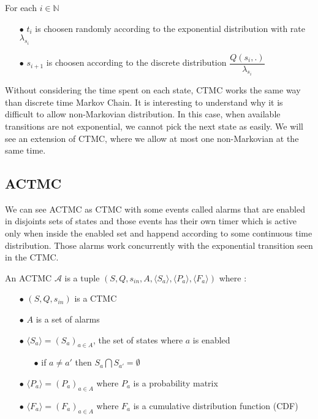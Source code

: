 For each $i \in \mathbb{N}$ \begin{itemize}
	\item[$\bullet$] $t_i$ is choosen randomly according to the exponential distribution with rate $\lambda_{s_i}$
	\item[$\bullet$] $s_{i+1}$ is choosen according to the discrete distribution $\dfrac{Q(s_i,.)}{\lambda_{s_i}}$
\end{itemize}

Without considering the time spent on each state, CTMC works the same way than discrete time Markov Chain. It is interesting to understand why it is difficult to allow non-Markovian distribution. In this case, when available transitions are not exponential, we cannot pick the next state as easily. We will see an extension of CTMC, where we allow at most one non-Markovian at the same time. 

\subsection{ACTMC}

We can see ACTMC as CTMC with some events called alarms that are enabled in disjoints sets of states and those events has their own timer which is active only when inside the enabled set and happend according to some continuous time distribution. Those alarms work concurrently with the exponential transition seen in the CTMC.

An ACTMC $\mathcal{A}$ is a tuple $(S,Q,s_{in},A,\langle S_a \rangle,\langle P_a \rangle,\langle F_a \rangle)$
where :
\begin{itemize}
	\item[$\bullet$]$(S,Q,s_{in})$ is a CTMC
	\item[$\bullet$] $A$ is a set of alarms
	\item[$\bullet$] $\langle S_a \rangle = (S_a)_{a \in A}$, the set of states where $a$ is enabled
		\begin{itemize}
			\item[$\bullet$] if $a \neq a'$ then $S_a \bigcap S_{a'} = \emptyset$ 
		\end{itemize}
	\item[$\bullet$]$\langle P_a \rangle = (P_a)_{a \in A}$ where $P_a$ is a probability matrix
	\item[$\bullet$]$\langle F_a \rangle = (F_a)_{a \in A}$ where $F_a$ is a cumulative distribution function (CDF) 
\end{itemize}


